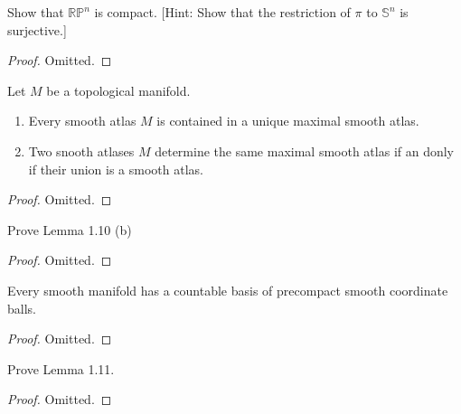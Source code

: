 \begin{exercise}
\label{exercise-1-3}

Show that $\mathbb R \mathbb P^n$ is compact. [Hint: Show that the restriction
of $\pi$ to $\mathbb S^n$ is surjective.]

\end{exercise}

\begin{proof}
Omitted.
\end{proof}

\begin{lemma}
\label{lemma-1-10}

Let $M$ be a topological manifold.

\begin{enumerate}
\item Every smooth atlas $M$ is contained in a unique maximal smooth atlas.
\item Two snooth atlases $M$ determine the same maximal smooth atlas if an donly
if their union is a smooth atlas.
\end{enumerate}

\end{lemma}

\begin{proof}
Omitted.
\end{proof}

\begin{exercise}
\label{exercise-1-4}

Prove Lemma 1.10 (b)

\end{exercise}

\begin{proof}
Omitted.
\end{proof}

\begin{lemma}
\label{lemma-1-11}

Every smooth manifold has a countable basis of precompact smooth coordinate
balls.

\end{lemma}

\begin{proof}
Omitted.
\end{proof}

\begin{exercise}
\label{exercise-1-5}

Prove Lemma 1.11.

\end{exercise}

\begin{proof}
Omitted.
\end{proof}

